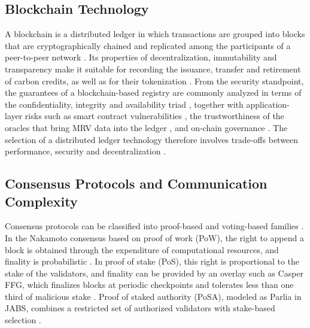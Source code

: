 \documentclass[english]{sbc2025}%
\begin{document}
\subsection{Blockchain Technology}

A blockchain is a distributed ledger in which transactions are grouped into blocks that are cryptographically chained and replicated among the participants of a peer-to-peer network \citep{Nakamoto2008}. Its properties of decentralization, immutability and transparency make it suitable for recording the issuance, transfer and retirement of carbon credits, as well as for their tokenization \citep{Vilkov2023,Kotsialou2021}. From the security standpoint, the guarantees of a blockchain-based registry are commonly analyzed in terms of the confidentiality, integrity and availability triad \citep{Aminzade2018,Tchernykh2019,Rashidibajgan2024}, together with application-layer risks such as smart contract vulnerabilities \citep{GhiyamiPour2025}, the trustworthiness of the oracles that bring MRV data into the ledger \citep{Rahman2023}, and on-chain governance \citep{Esposito2025}. The selection of a distributed ledger technology therefore involves trade-offs between performance, security and decentralization \citep{Werth2023,Rodrigues2024}.

\subsection{Consensus Protocols and Communication Complexity}

Consensus protocols can be classified into proof-based and voting-based families \citep{Xiao2020,Bamakan2020}. In the Nakamoto consensus based on proof of work (PoW), the right to append a block is obtained through the expenditure of computational resources, and finality is probabilistic \citep{Nakamoto2008}. In proof of stake (PoS), this right is proportional to the stake of the validators, and finality can be provided by an overlay such as Casper FFG, which finalizes blocks at periodic checkpoints and tolerates less than one third of malicious stake \citep{Buterin2017}. Proof of staked authority (PoSA), modeled as Parlia in JABS, combines a restricted set of authorized validators with stake-based selection \citep{Caburlao2026clei}.
\end{document}
